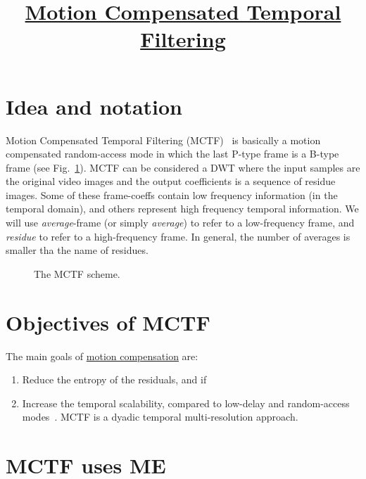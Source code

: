 
\title{\href{https://github.com/vicente-gonzalez-ruiz/MCTF}{Motion Compensated Temporal Filtering}}

\maketitle

\section{Idea and notation}

Motion Compensated Temporal Filtering (MCTF)~\cite{ohm1994three} is
basically a motion compensated random-access mode in which the last
P-type frame is a B-type frame (see Fig.~\ref{fig:MCTF}). MCTF can be
considered a DWT where the input samples are the original video images
and the output coefficients is a sequence of residue images. Some of
these frame-coeffs contain low frequency information (in the temporal
domain), and others represent high frequency temporal information. We
will use \emph{average}-frame (or simply \emph{average}) to refer to a
low-frequency frame, and \emph{residue} to refer to a high-frequency
frame. In general, the number of averages is smaller tha the name of
residues.

\begin{figure}
  \caption{The MCTF scheme.}
  \label{fig:MCTF}
\end{figure}


\section{Objectives of MCTF}

The main goals of
\href{https://en.wikipedia.org/wiki/Motion_compensation}{motion
  compensation} are:
\begin{enumerate}
\item Reduce the entropy of the residuals, and if
\item Increase the temporal scalability, compared to low-delay and
  random-access modes~\cite{vruiz__MC}. MCTF is a
  dyadic temporal multi-resolution approach.
\end{enumerate}
  

\section{MCTF uses ME}

